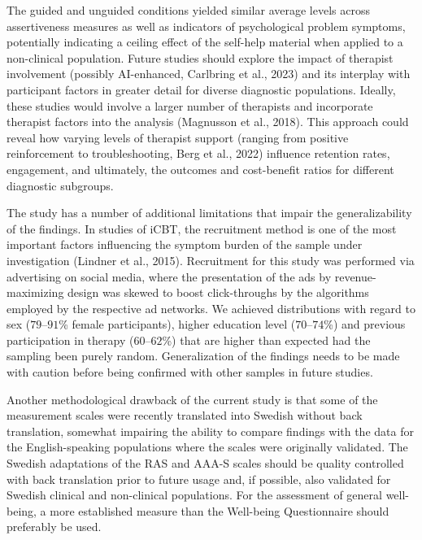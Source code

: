 \documentclass[3p]{elsarticle} %
\begin{document}
The guided and unguided conditions yielded similar average levels across
assertiveness measures as well as indicators of psychological problem
symptoms, potentially indicating a ceiling effect of the self-help
material when applied to a non-clinical population. Future studies
should explore the impact of therapist involvement (possibly
AI-enhanced, Carlbring et al., 2023) and its interplay with participant
factors in greater detail for diverse diagnostic populations. Ideally,
these studies would involve a larger number of therapists and
incorporate therapist factors into the analysis (Magnusson et al.,
2018). This approach could reveal how varying levels of therapist
support (ranging from positive reinforcement to troubleshooting, Berg et
al., 2022) influence retention rates, engagement, and ultimately, the
outcomes and cost-benefit ratios for different diagnostic subgroups.

The study has a number of additional limitations that impair the
generalizability of the findings. In studies of iCBT, the recruitment
method is one of the most important factors influencing the symptom
burden of the sample under investigation (Lindner et al., 2015).
Recruitment for this study was performed via advertising on social
media, where the presentation of the ads by revenue-maximizing design
was skewed to boost click-throughs by the algorithms employed by the
respective ad networks. We achieved distributions with regard to sex
(\(79\)--\(91\)\% female participants), higher education level
(\(70\)--\(74\)\%) and previous participation in therapy
(\(60\)--\(62\)\%) that are higher than expected had the sampling been
purely random. Generalization of the findings needs to be made with
caution before being confirmed with other samples in future studies.

Another methodological drawback of the current study is that some of the
measurement scales were recently translated into Swedish without back
translation, somewhat impairing the ability to compare findings with the
data for the English-speaking populations where the scales were
originally validated. The Swedish adaptations of the RAS and AAA-S
scales should be quality controlled with back translation prior to
future usage and, if possible, also validated for Swedish clinical and
non-clinical populations. For the assessment of general well-being, a
more established measure than the Well-being Questionnaire should
preferably be used.
\end{document}
